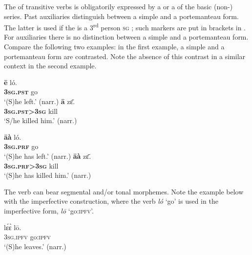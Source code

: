 \documentclass[output=paper,newtxmath,modfonts,nonflat,hidelinks]{langsci/langscibook}
\begin{document}
The  of transitive verbs is obligatorily expressed by a  or a  of the basic (non-) series. Past auxiliaries distinguish between a simple and a portemanteau form. The latter is used if the  is a 3\textsuperscript{rd} person \textsc{sg} ; such markers are put in brackets in  . For  auxiliaries there is no distinction between a simple and a portemanteau form. Compare the following two examples: in the first example, a simple and a portemanteau form are contrasted. Note the absence of this contrast in a similar context in the second example.

\begin{exe} \ex
\label{khachexpst}
\begin{xlist} \ex
\gll \textbf{ē}	ló.\\
\textbf{3\textsc{sg}.\textsc{pst}} go\\
\glt ‘(S)he left.’ (narr.)
\ex
\gll \textbf{ā}		zɛ̄.	\\
\textbf{3\textsc{sg}.\textsc{pst}>3\textsc{sg}}		kill \\
\glt ‘S/he killed him.’ (narr.)

\end{xlist}
\end{exe}

\begin{exe} \ex
\label{khachexprf}
\begin{xlist} \ex
\gll \textbf{āà}	ló.	\\
\textbf{3\textsc{sg}.\textsc{prf}}	go	\\
\glt ‘(S)he has left.’ (narr.)
\ex
\gll \textbf{āà}		zɛ̄.\\
\textbf{3\textsc{sg}.\textsc{prf}>3\textsc{sg}}		kill \\
\glt  ‘(S)he has killed him.’ (narr.)
\end{xlist}
\end{exe}


The verb can bear segmental and/or tonal morphemes. Note the example below with the imperfective construction, where the verb \textit{ló} `go' is used in the imperfective form, \textit{lō} `go:\textsc{ipfv}'.

\begin{exe}\ex
\gll lɛ́ɛ̀	lō.	\\
	3\textsc{sg}.\textsc{ipfv} go:\textsc{ipfv}\\
\glt ‘(S)he leaves.’ (narr.)
\end{exe}
\end{document}
